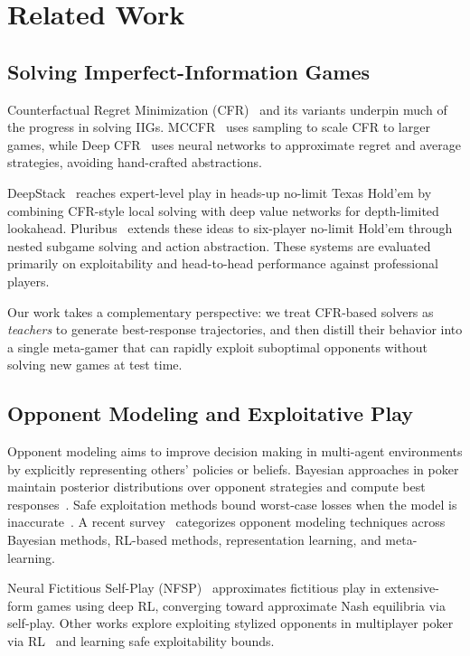 \documentclass{article}
\begin{document}
\section{Related Work}
\label{sec:related}

\subsection{Solving Imperfect-Information Games}

Counterfactual Regret Minimization (CFR)~\citep{zinkevich2008cfr} and its variants underpin much of the progress in solving IIGs. MCCFR~\citep{gibson2012mccfr} uses sampling to scale CFR to larger games, while Deep CFR~\citep{brown2019deepcfr} uses neural networks to approximate regret and average strategies, avoiding hand-crafted abstractions.

DeepStack~\citep{moravcik2017deepstack} reaches expert-level play in heads-up no-limit Texas Hold'em by combining CFR-style local solving with deep value networks for depth-limited lookahead. Pluribus~\citep{brown2019superhuman} extends these ideas to six-player no-limit Hold'em through nested subgame solving and action abstraction. These systems are evaluated primarily on exploitability and head-to-head performance against professional players.

Our work takes a complementary perspective: we treat CFR-based solvers as \emph{teachers} to generate best-response trajectories, and then distill their behavior into a single meta-gamer that can rapidly exploit suboptimal opponents without solving new games at test time.

\subsection{Opponent Modeling and Exploitative Play}

Opponent modeling aims to improve decision making in multi-agent environments by explicitly representing others' policies or beliefs. Bayesian approaches in poker maintain posterior distributions over opponent strategies and compute best responses~\citep{southey2005bayesbluff,ganzfried2018bayesian}. Safe exploitation methods bound worst-case losses when the model is inaccurate~\citep{ganzfried2018bayesian}. A recent survey~\citep{nashed2022opponentSurvey} categorizes opponent modeling techniques across Bayesian methods, RL-based methods, representation learning, and meta-learning.

Neural Fictitious Self-Play (NFSP)~\citep{heinrich2016nfsp} approximates fictitious play in extensive-form games using deep RL, converging toward approximate Nash equilibria via self-play. Other works explore exploiting stylized opponents in multiplayer poker via RL~\citep{exploitingStylizedPoker} and learning safe exploitability bounds.
\end{document}
